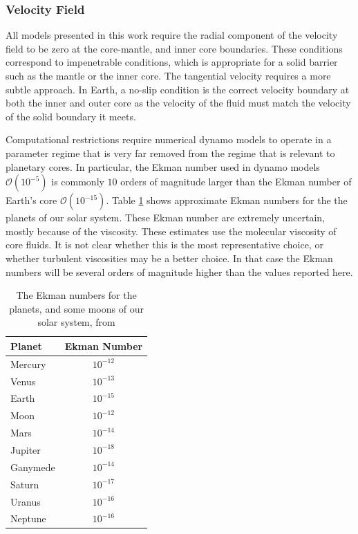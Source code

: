 \subsubsection{Velocity Field}
All models presented in this work require the radial component of the velocity field to be zero at the core-mantle, and inner core boundaries. These conditions correspond to  impenetrable conditions, which is appropriate for a solid barrier such as the mantle or the inner core. The tangential velocity requires a more subtle approach. In Earth, a no-slip  condition is the correct velocity boundary at both the inner and outer core as the velocity of the fluid must match the velocity of the solid boundary it meets. 

Computational restrictions require numerical dynamo models to operate in a parameter regime that is very far removed from the regime that is relevant to planetary cores. In particular, the Ekman number used in dynamo models $\mathcal{O}\left( 10^{-5} \right)$ is commonly $10$ orders of magnitude larger than the Ekman number of Earth's core $\mathcal{O}\left(10^{-15}\right)$. Table \ref{tab:ekman} shows approximate Ekman numbers for the the planets of our solar system. These Ekman number are extremely uncertain, mostly because of the viscosity. These estimates use the molecular viscosity of core fluids. It is not clear whether this is the most representative choice, or whether turbulent viscosities may be a better choice. In that case the Ekman numbers will be several orders of magnitude higher than the values reported here.
\begin{table}[]
\centering
\caption{The Ekman numbers for the planets, and some moons of our solar system, from \citet{OlsonandChristensen2006}}
\label{tab:ekman}
\begin{tabular}{l|c}
Planet       & \multicolumn{1}{l}{Ekman Number} \\ \hline
Mercury      & $10^{-12}$                              \\
Venus        & $10^{-13}$                              \\
Earth        & $10^{-15}$                              \\
Moon         & $10^{-12}$                              \\
Mars         & $10^{-14}$                              \\
Jupiter      & $10^{-18}$                              \\
Ganymede     & $10^{-14}$                              \\
Saturn & $10^{-17}$                              \\
Uranus       & $10^{-16}$                              \\
Neptune      & $10^{-16}$                             
\end{tabular}
\end{table}


